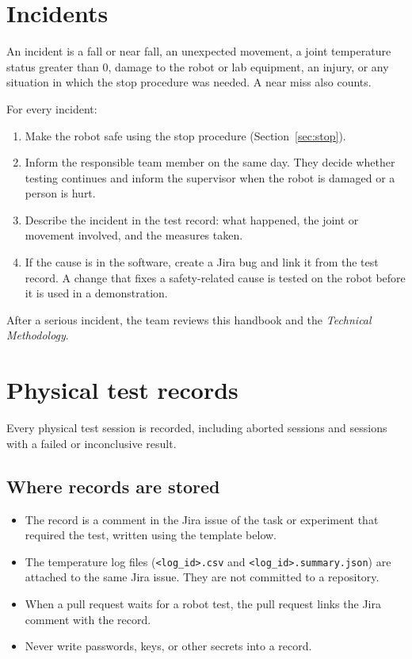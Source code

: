 \documentclass[12pt,a4paper]{article}
\begin{document}
\section{Incidents}
\label{sec:incidents}

An incident is a fall or near fall, an unexpected movement, a joint temperature status greater than 0, damage to the robot or lab equipment, an injury, or any situation in which the stop procedure was needed. A near miss also counts.

For every incident:

\begin{enumerate}
\item Make the robot safe using the stop procedure (Section~\ref{sec:stop}).
\item Inform the responsible team member on the same day. They decide whether testing continues and inform the supervisor when the robot is damaged or a person is hurt.
\item Describe the incident in the test record: what happened, the joint or movement involved, and the measures taken.
\item If the cause is in the software, create a Jira bug and link it from the test record. A change that fixes a safety-related cause is tested on the robot before it is used in a demonstration.
\end{enumerate}

After a serious incident, the team reviews this handbook and the \emph{Technical Methodology}.

\section{Physical test records}
\label{sec:records}

Every physical test session is recorded, including aborted sessions and sessions with a failed or inconclusive result.

\subsection{Where records are stored}

\begin{itemize}
\item The record is a comment in the Jira issue of the task or experiment that required the test, written using the template below.
\item The temperature log files (\texttt{<log\_id>.csv} and \texttt{<log\_id>.summary.json}) are attached to the same Jira issue. They are not committed to a repository.
\item When a pull request waits for a robot test, the pull request links the Jira comment with the record.
\item Never write passwords, keys, or other secrets into a record.
\end{itemize}
\end{document}

